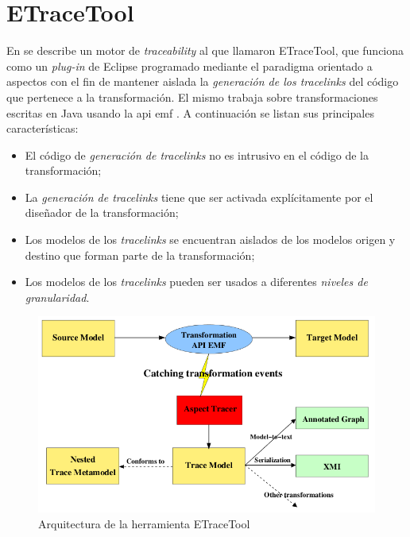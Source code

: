 \documentclass[a4paper,12pt,oneside,spanish]{book}
\begin{document}
\bigskip


\minitoc 


\pagebreak


\section{ETraceTool}
\label{sec:ETraceTool}

En \cite{AmarLeblancCoulette} se describe un motor de \textit{traceability} al que llamaron \textsf{ETraceTool}, que funciona como un \textit{plug-in} de \textsf{Eclipse} programado mediante el paradigma orientado a aspectos con el fin de mantener aislada la \textit{generación de los tracelinks} del código que pertenece a la transformación. El mismo trabaja sobre transformaciones escritas en \textsf{Java} usando la \gls{api} \gls{emf} \cite{EMF}. A continuación se listan sus principales características:

\begin{itemize}
\item El código de \textit{generación de tracelinks} no es intrusivo en el código de la transformación;
\item La \textit{generación de tracelinks} tiene que ser activada explícitamente por el diseñador de la transformación;
\item Los modelos de los \textit{tracelinks} se encuentran aislados de los modelos origen y destino que forman parte de la transformación;
\item Los modelos de los \textit{tracelinks} pueden ser usados a diferentes \textit{niveles de granularidad}.
\end{itemize}

\begin{figure}[hbtp]
\centering
\includegraphics[scale=0.55]{./img/ETraceTool_Arquitectura}
\caption{Arquitectura de la herramienta ETraceTool}
\label{fig:ArqETraceTool}
\end{figure}
\end{document}
